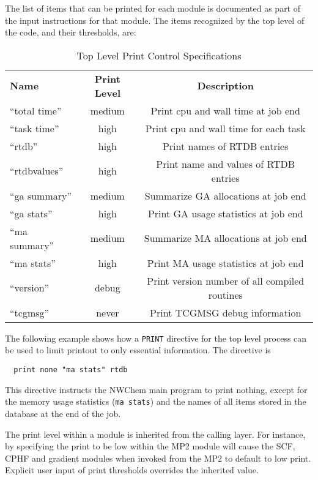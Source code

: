 The list of items that can be printed for each module is documented 
as part of the input instructions for that module.
The items recognized by the top level of the code, and their thresholds, 
are:
\begin{table}[htbp]
\begin{center}
\begin{tabular}{lcc}
  {\bf Name}          & {\bf Print Level} & {\bf Description} \\
 ``total time''        & medium & Print cpu and wall time at job end\\
 ``task time''         & high   & Print cpu and wall time for each task\\
 ``rtdb''              & high    & Print names of RTDB entries\\
 ``rtdbvalues''        & high    & Print name and values of RTDB entries\\
 ``ga summary''        & medium & Summarize GA allocations at job end \\
 ``ga stats''          & high   & Print GA usage statistics at job end \\
 ``ma summary''        & medium & Summarize MA allocations at job end \\
 ``ma stats''          & high   & Print MA usage statistics at job end \\
 ``version''           & debug  & Print version number of all compiled routines \\
  ``tcgmsg''           & never  & Print TCGMSG debug information \\
\end{tabular}
\end{center}
\caption{Top Level Print Control Specifications}
\end{table}


The following example shows how a \verb+PRINT+ directive for the top level
process can be used to limit printout to only essential information.
The directive is

\begin{verbatim}
  print none "ma stats" rtdb
\end{verbatim}

This directive instructs the NWChem main program to print nothing,
except for the memory usage statistics (\verb+ma stats+) and
the names of all items stored in the database at the end of the job.

The print level within a module is inherited from the 
calling layer.  For instance, by specifying the print to be low
within the MP2 module will cause the SCF, CPHF and gradient modules
when invoked from the MP2 to default to low print.  Explicit user
input of print thresholds overrides the inherited value.

